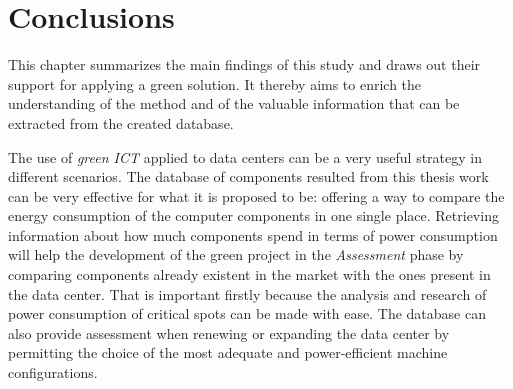 

\chapter{Conclusions} \label{conclusion}





    This chapter summarizes the main findings of this study and draws out their support for applying a green solution. It thereby aims to enrich the understanding of the method and of the valuable information that can be extracted from the created database.
    
    The use of \emph{green ICT} applied to data centers can be a very useful strategy in different scenarios. The database of components resulted from this thesis work can be very effective for what it is proposed to be: offering a way to compare the energy consumption of the computer components in one single place. Retrieving information about how much components spend in terms of power consumption will help the development of the green project in the \emph{Assessment} phase by comparing components already existent in the market with the ones present in the data center. That is important firstly because the analysis and research of power consumption of critical spots can be made with ease. The database can also provide assessment when renewing or expanding the data center by permitting the choice of the most adequate and power-efficient machine configurations.
    

